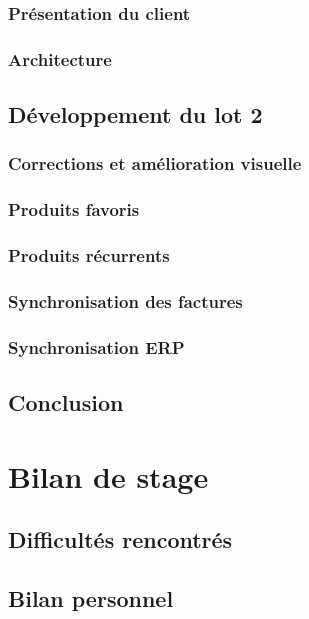 \documentclass{Article}
\begin{document}
		\subsubsection{Présentation du client}
		\subsubsection{Architecture}
	\subsection{Développement du lot 2}
		\subsubsection{Corrections et amélioration visuelle}
		\subsubsection{Produits favoris}
		\subsubsection{Produits récurrents}
		\subsubsection{Synchronisation des factures}
		\subsubsection{Synchronisation ERP}
	\subsection{Conclusion}	
\section{Bilan de stage}
	\subsection{Difficultés rencontrés}
	\subsection{Bilan personnel}
\end{document}
